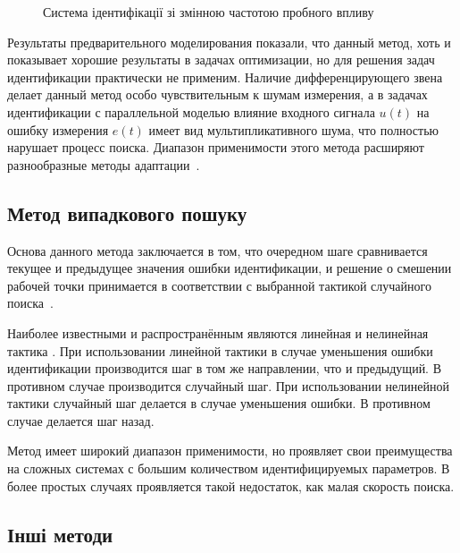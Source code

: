 \begin{figure}[htb!]
\begin{center}

\end{center}
\caption{Система ідентифікації зі змінною частотою пробного впливу}
\label{atu:f:varfreq}
\end{figure}


Результаты предварительного моделирования показали,
что данный метод, хоть и показывает хорошие результаты
в задачах оптимизации, но для решения задач идентификации
практически не применим. Наличие дифференцирующего
звена делает данный метод особо чувствительным к шумам
измерения, а в задачах идентификации с параллельной моделью
влияние входного сигнала \( u(t) \)
на ошибку измерения \( e(t) \)
имеет вид мультипликативного шума,
что полностью нарушает процесс поиска.
Диапазон применимости этого метода расширяют разнообразные методы
адаптации~\cite{auto_optim_intask}.


\subsection{Метод випадкового пошуку}%

Основа данного метода заключается в том, что
очередном шаге сравнивается текущее и предыдущее
значения ошибки идентификации, и решение о смешении
рабочей точки принимается в соответствии с выбранной
тактикой случайного поиска~\cite{rastr_rand_search,rastr_rand_search_adopt,ivanov_stoh_alg_int}.

Наиболее известными и распространённым
являются линейная и нелинейная тактика
\cite{rastr_rand_search,gladkov_optim_nongrad}.
При использовании линейной тактики
в случае уменьшения ошибки идентификации
производится шаг в том же направлении, что и предыдущий.
В противном случае производится случайный шаг.
При использовании нелинейной тактики
случайный шаг делается в случае уменьшения ошибки.
В противном случае делается шаг назад.

Метод имеет широкий диапазон применимости,
но проявляет свои преимущества на сложных
системах с большим количеством идентифицируемых параметров.
В более простых случаях проявляется такой недостаток,
как малая скорость поиска.


\subsection{Інші методи} %


